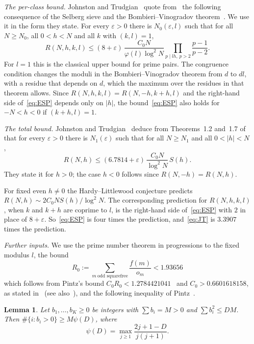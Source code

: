 \documentclass[11pt]{amsart}
\newtheorem{lemma}[theorem]{Lemma}
\theoremstyle{definition}
\theoremstyle{remark}
\numberwithin{equation}{section}
\newcommand{\Lich}{6.7814}
\begin{document}
\emph{The per-class bound.} Johnston and Trudgian~\cite[Section~4.2]{JT26} quote from~\cite[(28)]{ESP18} the following consequence of the Selberg sieve and the Bombieri--Vinogradov theorem~\cite{BD66,HR74}. We use it in the form they state. For every $\varepsilon>0$ there is $N_0(\varepsilon,l)$ such that for all $N\ge N_0$, all $0<h<N$ and all $k$ with $(k,l)=1$,
\begin{equation}\label{eq:ESP}
R(N,h,k,l)\le(8+\varepsilon)\,\frac{C_0N}{\varphi(l)\log^2N}\prod_{p\mid lh,\ p>2}\frac{p-1}{p-2}.
\end{equation}
For $l=1$ this is the classical upper bound for prime pairs. The congruence condition changes the moduli in the Bombieri--Vinogradov theorem from $d$ to $dl$, with a residue that depends on $d$, which the maximum over the residues in that theorem allows. Since $R(N,h,k,l)=R(N,-h,k+h,l)$ and the right-hand side of~\eqref{eq:ESP} depends only on $|h|$, the bound~\eqref{eq:ESP} also holds for $-N<h<0$ if $(k+h,l)=1$.

\emph{The total bound.} Johnston and Trudgian~\cite[Proposition~2]{JT26} deduce from Theorems~1.2 and~1.7 of~\cite{Lic23} that for every $\varepsilon>0$ there is $N_1(\varepsilon)$ such that for all $N\ge N_1$ and all $0<|h|<N$,
\begin{equation}\label{eq:JT}
R(N,h)\le(\Lich+\varepsilon)\,\frac{C_0N}{\log^2N}\,S(h).
\end{equation}
They state it for $h>0$; the case $h<0$ follows since $R(N,-h)=R(N,h)$.

For fixed even $h\ne0$ the Hardy--Littlewood conjecture predicts $R(N,h)\sim2C_0NS(h)/\log^2N$. The corresponding prediction for $R(N,h,k,l)$, when $k$ and $k+h$ are coprime to $l$, is the right-hand side of~\eqref{eq:ESP} with $2$ in place of $8+\varepsilon$. So~\eqref{eq:ESP} is four times the prediction, and~\eqref{eq:JT} is $3.3907$ times the prediction.

\emph{Further inputs.} We use the prime number theorem in progressions to the fixed modulus $l$, the bound
\begin{equation}\label{eq:R0}
R_0:=\sum_{m\ \text{odd squarefree}}\frac{f(m)}{o_m}<1.93656
\end{equation}
which follows from Pintz's bound $C_0R_0<1.2784421041$~\cite[Lemma~2$''$]{Pin06} and $C_0>0.6601618158$, as stated in~\cite[p.~55]{PT15} (see also~\cite[(17)]{JT26}), and the following inequality of Pintz~\cite[Lemma~4$'$]{Pin06}.

\begin{lemma}\label{lem:pintz}
Let $b_1,\dots,b_K\ge0$ be integers with $\sum b_i=M>0$ and $\sum b_i^2\le DM$. Then $\#\{i:b_i>0\}\ge M\psi(D)$, where
\[
\psi(D)=\max_{j\ge1}\frac{2j+1-D}{j(j+1)}.
\]
\end{lemma}
\end{document}
